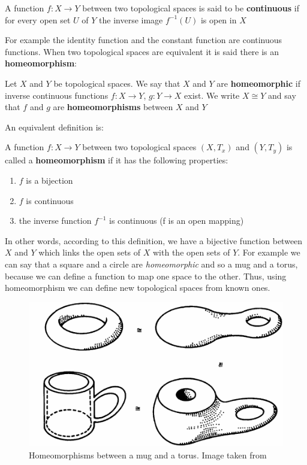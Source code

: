 \begin{definition}
 A function $f \colon X \rightarrow Y$ between two topological spaces is said to be \textbf{continuous} if for every open set $U$ of $Y$ the inverse image $f^{-1}(U)$ is open in $X$
\end{definition}

For example the identity function and the constant function are continuous functions. When two topological spaces are equivalent it is said there is an \textbf{homeomorphism}:

\begin{definition}[Homeomorphism]
 Let $X$ and $Y$ be topological spaces. We say that $X$ and $Y$ are \textbf{homeomorphic} if inverse continuous functions $f \colon X \rightarrow Y$, $g \colon Y \rightarrow X$ exist. We write $X \cong Y$ and say that $f$ and $g$ are \textbf{homeomorphisms} between $X$ and $Y$
\end{definition}

An equivalent definition is:
\begin{definition}[Homeomorphism(2)]
 A function $f \colon X \rightarrow Y$ between two topological spaces $(X,T_{x})$ and $(Y, T_{y})$ is called a \textbf{homeomorphism} if it has the following properties:
 \begin{enumerate}
  \item $f$ is a bijection
  \item $f$ is continuous
  \item the inverse function $f^{-1}$ is continuous (f is an open mapping)
 \end{enumerate}

\end{definition}

In other words, according to this definition, we have a bijective function between $X$ and $Y$ which links the open sets of $X$ with the open sets of $Y$. For example we can say that a square and a circle are \textit{homeomorphic} and so a mug and a torus, because we can define a function to map one space to the other. Thus, using homeomorphism we can define new topological spaces from known ones.\\

\begin{figure}[htb] %
   \centering
   \includegraphics[width=0.45\linewidth]{images/mugTorus.png}
   \caption[Homeomorphisms between a mug and a torus]{Homeomorphisms between a mug and a torus. Image taken from~\cite{Kosniowski}}
   \label{fig:homeomorphisms}
\end{figure}

